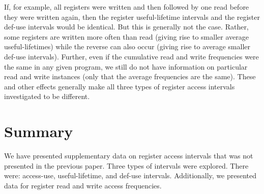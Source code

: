 \documentclass[10pt,dvips]{article}
\begin{document}
If, for example, all registers were written and then followed by
one read before they were written again, then the register useful-lifetime
intervals and the register def-use intervals would be identical.
But this is generally not the case.  Rather, some registers are
written more often than read (giving rise to smaller average useful-lifetimes)
while the reverse can also occur (giving rise to average smaller def-use
intervals).
Further, even if the cumulative read and write frequencies were
the same in any given program, we still do not have information
on particular read and write instances (only that the average frequencies
are the same).  These and other effects generally make all three
types of register access intervals investigated to be different.
%
%
%
%
\section{Summary}
%
We have presented supplementary data on register access intervals
that was not presented in the previous paper.
Three types of intervals were explored.  There were:
access-use, useful-lifetime, and def-use intervals.
Additionally, we presented data for register read and write
access frequencies.

%


%
\end{document}
